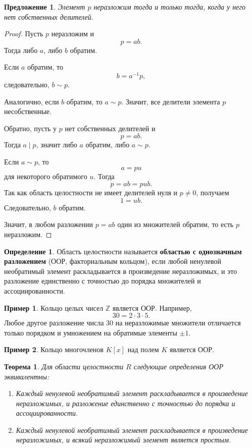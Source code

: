 \documentclass[12pt, a4paper]{article}
\newtheorem{theorem}{Теорема}
\newtheorem{proposition}{Предложение}
\theoremstyle{definition}
\newtheorem{definition}{Определение}
\newtheorem{example}{Пример}
\theoremstyle{remark}
\begin{document}
\begin{proposition}
	Элемент $p$ неразложим тогда и только тогда, когда у него нет собственных
	делителей.
\end{proposition}

\begin{proof}
	Пусть $p$ неразложим и
	\[
	p=ab.
	\]
	Тогда либо $a$, либо $b$ обратим.
	
	Если $a$ обратим, то
	\[
	b=a^{-1}p,
	\]
	следовательно, $b \sim p$.
	
	Аналогично, если $b$ обратим, то $a \sim p$.
	Значит, все делители элемента $p$ несобственные.
	
	Обратно, пусть у $p$ нет собственных делителей и
	\[
	p=ab.
	\]
	Тогда $a \mid p$, значит либо $a$ обратим, либо $a \sim p$.
	
	Если $a \sim p$, то
	\[
	a=pu
	\]
	для некоторого обратимого $u$. Тогда
	\[
	p=ab=pub.
	\]
	Так как область целостности не имеет делителей нуля и $p \neq 0$, получаем
	\[
	1=ub.
	\]
	Следовательно, $b$ обратим.
	
	Значит, в любом разложении $p=ab$ один из множителей обратим, то есть
	$p$ неразложим.
\end{proof}

\begin{definition}
	Область целостности называется \textbf{областью с однозначным разложением}
	(ООР, факториальным кольцом), если любой ненулевой необратимый элемент
	раскладывается в произведение неразложимых, и это разложение единственно
	с точностью до порядка множителей и ассоциированности.
\end{definition}

\begin{example}
	Кольцо целых чисел $\mathbb{Z}$ является ООР.
	Например,
	\[
	30=2 \cdot 3 \cdot 5.
	\]
	Любое другое разложение числа $30$ на неразложимые множители отличается
	только порядком и умножением на обратимые элементы $\pm 1$.
\end{example}

\begin{example}
	Кольцо многочленов $K[x]$ над полем $K$ является ООР.
\end{example}

\begin{theorem}
	Для области целостности $R$ следующие определения ООР эквивалентны:
	\begin{enumerate}
		\item Каждый ненулевой необратимый элемент раскладывается в произведение
		неразложимых, и разложение единственно с точностью до порядка и
		ассоциированности.
		
		\item Каждый ненулевой необратимый элемент раскладывается в произведение
		неразложимых, и всякий неразложимый элемент является простым.
	\end{enumerate}
\end{theorem}
\end{document}

